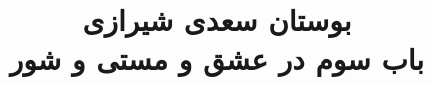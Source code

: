 \documentclass[14pt,b5paper]{article}
\begin{document}
\title{\Huge بوستان سعدی شیرازی \\
باب سوم در عشق و مستی و شور}
\author{ }
\date{ }
\maketitle
\newpage
\tableofcontents
\newpage

\newpage

\newpage

\newpage

\newpage

\newpage

\newpage

\newpage

\newpage

\newpage

\newpage

\newpage

\newpage

\newpage

\newpage

\newpage

\newpage

\newpage

\newpage

\newpage

\newpage

\newpage

\newpage

\newpage

\newpage

\newpage
\end{document}
